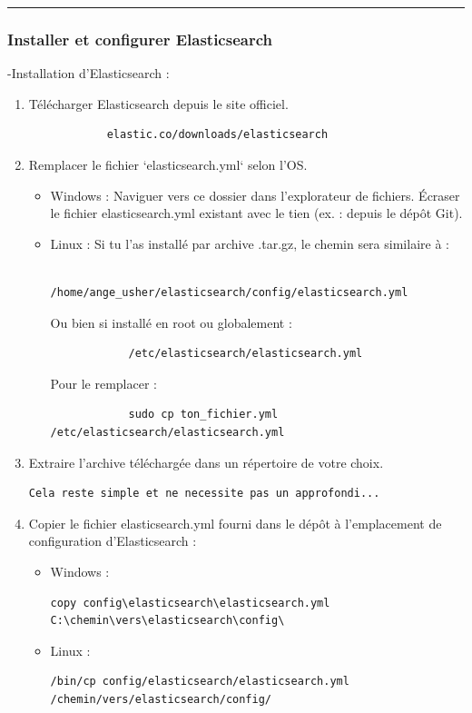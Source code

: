 \documentclass[12pt]{article}
\begin{document}
\rule{\linewidth}{0.2pt}
    \subsubsection{Installer et configurer Elasticsearch} 
-Installation d'Elasticsearch :
\begin{enumerate}

    \item Télécharger Elasticsearch depuis le site officiel.
        \begin{lstlisting}
            elastic.co/downloads/elasticsearch
        \end{lstlisting}
    \item Remplacer le fichier `elasticsearch.yml` selon l'OS.
        \begin{itemize}
            \item Windows :        
Naviguer vers ce dossier dans l'explorateur de fichiers.
Écraser le fichier elasticsearch.yml existant avec le tien (ex. : depuis le dépôt Git).           
            \item Linux :
Si tu l’as installé par archive .tar.gz, le chemin sera similaire à :
        \begin{lstlisting}
            /home/ange_usher/elasticsearch/config/elasticsearch.yml
        \end{lstlisting}
Ou bien si installé en root ou globalement :
        \begin{lstlisting}
            /etc/elasticsearch/elasticsearch.yml
        \end{lstlisting}
Pour le remplacer :
        \begin{lstlisting}
            sudo cp ton_fichier.yml /etc/elasticsearch/elasticsearch.yml
        \end{lstlisting}

        \end{itemize}
    \item Extraire l'archive téléchargée dans un répertoire de votre choix.
        \begin{lstlisting}
Cela reste simple et ne necessite pas un approfondi...
        \end{lstlisting}
    \item Copier le fichier elasticsearch.yml fourni dans le dépôt à l'emplacement de configuration d'Elasticsearch :        
        \begin{itemize}
            \item Windows :
            \begin{lstlisting}
copy config\elasticsearch\elasticsearch.yml C:\chemin\vers\elasticsearch\config\
            \end{lstlisting}
            \item Linux :
            \begin{lstlisting}
/bin/cp config/elasticsearch/elasticsearch.yml /chemin/vers/elasticsearch/config/
            \end{lstlisting}
        \end{itemize}
\end{enumerate}
\end{document}
